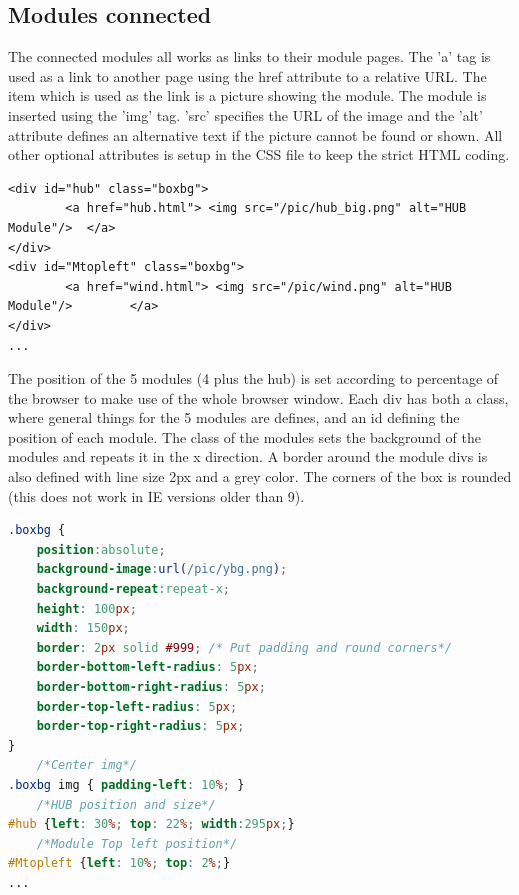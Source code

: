 \subsection{Modules connected}
The connected modules all works as links to their module pages. The 'a' tag is used as a link to another page using the href attribute to a relative URL. The item which is used as the link is a picture showing the module. The module is inserted using the 'img' tag. 'src' specifies the URL of the image and the 'alt' attribute defines an alternative text if the picture cannot be found or shown. All other optional attributes is setup in the CSS file to keep the strict HTML coding.
\begin{lstlisting}
<div id="hub" class="boxbg">
		<a href="hub.html"> <img src="/pic/hub_big.png" alt="HUB Module"/> 	</a>
</div>
<div id="Mtopleft" class="boxbg">
		<a href="wind.html"> <img src="/pic/wind.png" alt="HUB Module"/> 		</a>
</div>
...
\end{lstlisting}
The position of the 5 modules (4 plus the hub) is set according to percentage of the browser to make use of the whole browser window. Each div has both a class, where general things for the 5 modules are defines, and an id defining the position of each module. The class of the modules sets the background of the modules and repeats it in the x direction. A border around the module divs is also defined with line size 2px and a grey color. The corners of the box is rounded (this does not work in IE versions older than 9).
\begin{lstlisting}[language=CSS]
.boxbg {
	position:absolute;
	background-image:url(/pic/ybg.png);
	background-repeat:repeat-x;
	height: 100px;
	width: 150px;
	border: 2px solid #999;	/* Put padding and round corners*/
	border-bottom-left-radius: 5px;
	border-bottom-right-radius: 5px;
	border-top-left-radius: 5px;
	border-top-right-radius: 5px;
}
	/*Center img*/
.boxbg img { padding-left: 10%; }
	/*HUB position and size*/
#hub {left: 30%; top: 22%; width:295px;}
	/*Module Top left position*/
#Mtopleft {left: 10%; top: 2%;}
...
\end{lstlisting}

